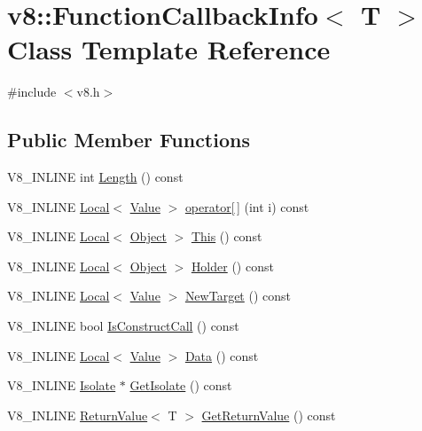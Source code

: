 \hypertarget{classv8_1_1FunctionCallbackInfo}{}\section{v8\+:\+:Function\+Callback\+Info$<$ T $>$ Class Template Reference}
\label{classv8_1_1FunctionCallbackInfo}


{\ttfamily \#include $<$v8.\+h$>$}

\subsection*{Public Member Functions}
\begin{DoxyCompactItemize}
\item 
V8\+\_\+\+I\+N\+L\+I\+NE int \mbox{\hyperlink{classv8_1_1FunctionCallbackInfo_af97dd3f1cb01ed039f9479152ad63a84}{Length}} () const
\item 
V8\+\_\+\+I\+N\+L\+I\+NE \mbox{\hyperlink{classv8_1_1Local}{Local}}$<$ \mbox{\hyperlink{classv8_1_1Value}{Value}} $>$ \mbox{\hyperlink{classv8_1_1FunctionCallbackInfo_a77dce5cad7b198c4181a522e9e0ab10f}{operator\mbox{[}$\,$\mbox{]}}} (int i) const
\item 
V8\+\_\+\+I\+N\+L\+I\+NE \mbox{\hyperlink{classv8_1_1Local}{Local}}$<$ \mbox{\hyperlink{classv8_1_1Object}{Object}} $>$ \mbox{\hyperlink{classv8_1_1FunctionCallbackInfo_a4ddfd6d21732dff1c4c55d5441a8a5ca}{This}} () const
\item 
V8\+\_\+\+I\+N\+L\+I\+NE \mbox{\hyperlink{classv8_1_1Local}{Local}}$<$ \mbox{\hyperlink{classv8_1_1Object}{Object}} $>$ \mbox{\hyperlink{classv8_1_1FunctionCallbackInfo_a708ab465862ed796e3b0b3c37ba05044}{Holder}} () const
\item 
V8\+\_\+\+I\+N\+L\+I\+NE \mbox{\hyperlink{classv8_1_1Local}{Local}}$<$ \mbox{\hyperlink{classv8_1_1Value}{Value}} $>$ \mbox{\hyperlink{classv8_1_1FunctionCallbackInfo_aa04f4c5c984db26a90b591f34550e6fa}{New\+Target}} () const
\item 
V8\+\_\+\+I\+N\+L\+I\+NE bool \mbox{\hyperlink{classv8_1_1FunctionCallbackInfo_ad2105b93e9b4d02f42b7338fa5950cbc}{Is\+Construct\+Call}} () const
\item 
V8\+\_\+\+I\+N\+L\+I\+NE \mbox{\hyperlink{classv8_1_1Local}{Local}}$<$ \mbox{\hyperlink{classv8_1_1Value}{Value}} $>$ \mbox{\hyperlink{classv8_1_1FunctionCallbackInfo_ab0ebfc2ea43af2fdfc3d085272bf499f}{Data}} () const
\item 
V8\+\_\+\+I\+N\+L\+I\+NE \mbox{\hyperlink{classv8_1_1Isolate}{Isolate}} $\ast$ \mbox{\hyperlink{classv8_1_1FunctionCallbackInfo_a7eee713a6f95d5707ce788861754682f}{Get\+Isolate}} () const
\item 
V8\+\_\+\+I\+N\+L\+I\+NE \mbox{\hyperlink{classv8_1_1ReturnValue}{Return\+Value}}$<$ T $>$ \mbox{\hyperlink{classv8_1_1FunctionCallbackInfo_a2cb41afe1e098a46d27d901b4cc1e6f5}{Get\+Return\+Value}} () const
\end{DoxyCompactItemize}
